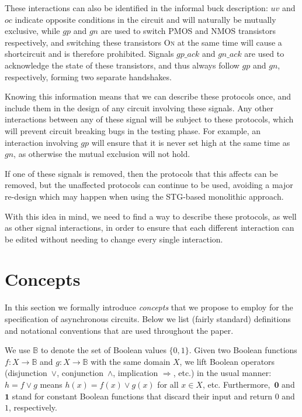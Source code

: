 \documentclass[british, journal]{IEEEtran}
\newcommand{\noun}[1]{\textsc{#1}}
\begin{document}
These interactions can also be identified in the informal buck description:
$uv$ and $oc$ indicate opposite conditions in the circuit and will naturally be
mutually exclusive, while $gp$ and $gn$ are used to switch PMOS and NMOS
transistors respectively, and switching these transistors \noun{On} at the same
time will cause a shortcircuit and is therefore prohibited. Signals $gp\_ack$
and $gn\_ack$ are used to acknowledge the state of these transistors, and thus
always follow $gp$ and $gn$, respectively, forming two separate handshakes.

Knowing this information means that we can describe these protocols once, and
include them in the design of any circuit involving these signals. Any other
interactions between any of these signal will be subject to these protocols,
which will prevent circuit breaking bugs in the testing phase. For example, an
interaction involving $gp$ will ensure that it is never set high at
the same time as $gn$, as otherwise the mutual exclusion will not hold.

If one of these signals is removed, then the protocols that this affects can
be removed, but the unaffected protocols can continue to be used, avoiding a
major re-design which may happen when using the STG-based monolithic approach.

With this idea in mind, we need to find a way to describe these protocols, as
well as other signal interactions, in order to ensure that each different
interaction can be edited without needing to change every single interaction.

\vspace{-2mm}
\section{Concepts \label{sec:Concepts}}

In this section we formally introduce \emph{concepts} that we propose
to employ for the specification of asynchronous circuits. Below we
list (fairly standard) definitions and notational conventions that
are used throughout the paper.

We use $\mathbb{B}$ to denote the set of Boolean values $\{0,1\}$.
Given two Boolean functions $f:X\rightarrow\mathbb{B}$ and $g:X\rightarrow\mathbb{B}$
with the same domain $X$, we lift Boolean operators (disjunction~$\vee$,
conjunction~$\wedge$, implication $\Rightarrow$, etc.) in the usual
manner: $h=f\vee g$ means $h(x)=f(x)\vee g(x)$ for all $x\in X$,
etc. Furthermore,~$\mathbf{0}$ and~$\mathbf{1}$ stand for constant
Boolean functions that discard their input and return $0$
and $1$, respectively.
\end{document}
